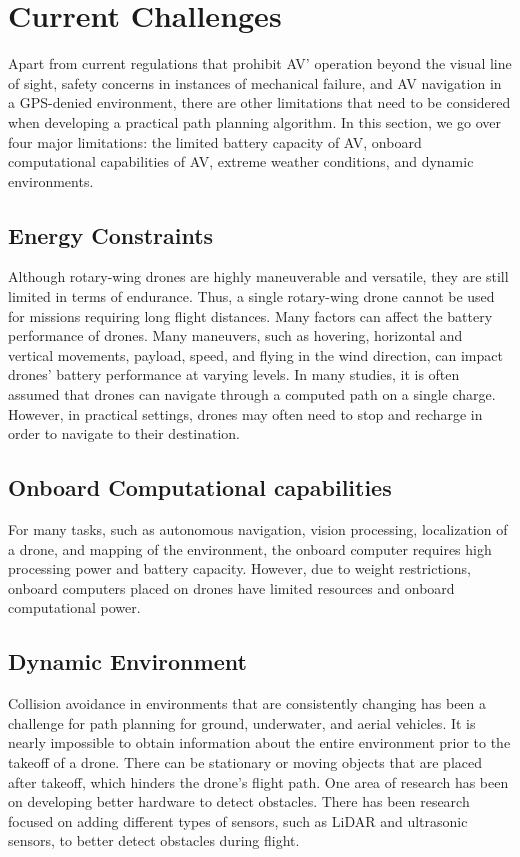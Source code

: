 \documentclass[11pt]{article}
\begin{document}
\section{Current Challenges}
Apart from current regulations that prohibit AV’ operation beyond the visual line of sight, safety concerns in instances of mechanical failure, and AV navigation in a GPS-denied environment, there are other limitations that need to be considered when developing a practical path planning algorithm. In this section, we go over four major limitations: the limited battery capacity of AV, onboard computational capabilities of AV, extreme weather conditions, and dynamic environments.

\subsection{Energy Constraints}
Although rotary-wing drones are highly maneuverable and versatile, they are still limited in terms of endurance. Thus, a single rotary-wing drone cannot be used for missions requiring long flight distances. Many factors can affect the battery performance of drones. Many maneuvers, such as hovering, horizontal and vertical movements, payload, speed, and flying in the wind direction, can impact drones’ battery performance at varying levels. In many studies, it is often assumed that drones can navigate through a computed path on a single charge. However, in practical settings, drones may often need to stop and recharge in order to navigate to their destination.
\subsection{Onboard Computational capabilities}
For many tasks, such as autonomous navigation, vision processing, localization of a drone, and mapping of the environment, the onboard computer requires high processing power and battery capacity. However, due to weight restrictions, onboard computers placed on drones have limited resources and onboard computational power.
\subsection{Dynamic Environment}
Collision avoidance in environments that are consistently changing has been a challenge for path planning for ground, underwater, and aerial vehicles. It is nearly impossible to obtain information about the entire environment prior to the takeoff of a drone. There can be stationary or moving objects that are placed after takeoff, which hinders the drone’s flight path. One area of research has been on developing better hardware to detect obstacles. There has been research focused on adding different types of sensors, such as LiDAR and ultrasonic sensors, to better detect obstacles during flight.
\end{document}
